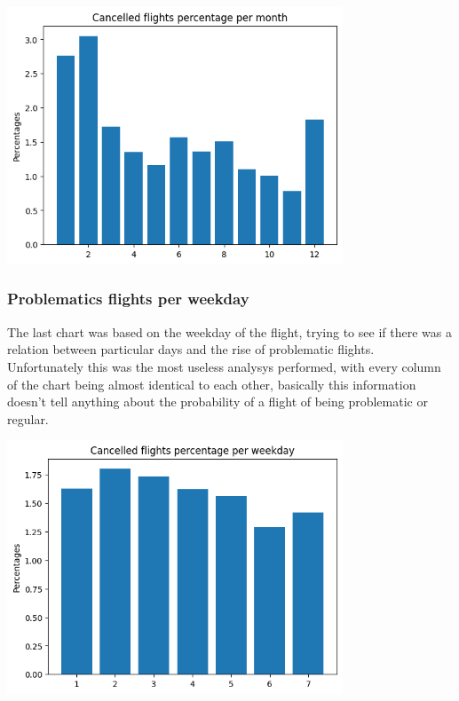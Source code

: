 \documentclass[
	letterpaper, %
	10pt, %
]{class}
\begin{document}
\begin{center}
    \includegraphics[width=10cm]{../images/cancelled_per_month.png}
\end{center}

\subsubsection{Problematics flights per weekday}

The last chart was based on the weekday of the flight, trying to see if there was a relation between particular days and the rise of problematic flights.\\

Unfortunately this was the most useless analysys performed, with every column of the chart being almost identical to each other, basically this information doesn't tell anything about the probability of a flight of being problematic or regular.

\begin{center}
    \includegraphics[width=10cm]{../images/cancelled_per_weekday.png}
\end{center}
\end{document}
